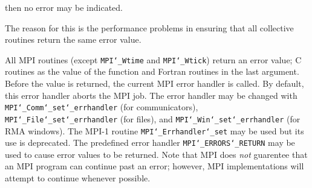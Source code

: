then no error may be indicated.
\par
The reason for this is the performance problems in ensuring that
all collective routines return the same error value.
\par
{}
\par
All MPI routines (except {\tt MPI{\tt \char`\_}Wtime} and {\tt MPI{\tt \char`\_}Wtick}) return an error value;
C routines as the value of the function and Fortran routines in the last
argument.  Before the value is returned, the current MPI error handler is
called.  By default, this error handler aborts the MPI job.  The error handler
may be changed with {\tt MPI{\tt \char`\_}Comm{\tt \char`\_}set{\tt \char`\_}errhandler} (for communicators),
{\tt MPI{\tt \char`\_}File{\tt \char`\_}set{\tt \char`\_}errhandler} (for files), and {\tt MPI{\tt \char`\_}Win{\tt \char`\_}set{\tt \char`\_}errhandler} (for
RMA windows).  The MPI-1 routine {\tt MPI{\tt \char`\_}Errhandler{\tt \char`\_}set} may be used but
its use is deprecated.  The predefined error handler
{\tt MPI{\tt \char`\_}ERRORS{\tt \char`\_}RETURN} may be used to cause error values to be returned.
Note that MPI does {\em not} guarentee that an MPI program can continue past
an error; however, MPI implementations will attempt to continue whenever
possible.
\par
{}
\par
{}
\endmanpage
